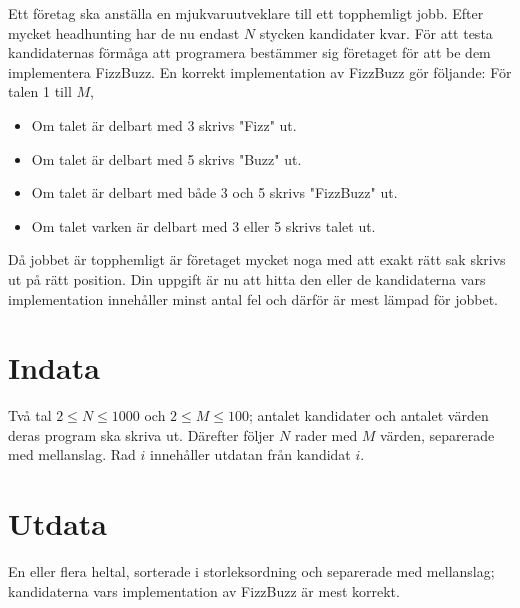 Ett företag ska anställa en mjukvaruutveklare till ett topphemligt jobb. Efter mycket headhunting har de nu endast $N$ stycken kandidater kvar. För att testa kandidaternas förmåga att programera bestämmer sig företaget för att be dem implementera FizzBuzz.
En korrekt implementation av FizzBuzz gör följande:
För talen 1 till $M$,
\begin{itemize}
 \item Om talet är delbart med 3 skrivs "Fizz" ut.
 \item Om talet är delbart med 5 skrivs "Buzz" ut.
 \item Om talet är delbart med både 3 och 5 skrivs "FizzBuzz" ut. 
 \item Om talet varken är delbart med 3 eller 5 skrivs talet ut. 
\end{itemize}

Då jobbet är topphemligt är företaget mycket noga med att exakt rätt sak skrivs ut på rätt position. Din uppgift är nu att hitta den eller de kandidaterna vars implementation innehåller minst antal fel och därför är mest lämpad för jobbet.

\section*{Indata}
Två tal $2 \leq N \leq 1000$ och $2 \leq M \leq 100$; antalet kandidater och antalet värden deras program ska skriva ut.
Därefter följer $N$ rader med $M$ värden, separerade med mellanslag. Rad $i$ innehåller utdatan från kandidat $i$.  

\section*{Utdata}
En eller flera heltal, sorterade i storleksordning och separerade med mellanslag; kandidaterna vars implementation av FizzBuzz är mest korrekt. 


